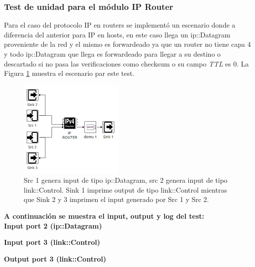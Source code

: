 \documentclass[10pt,a4paper]{article}
\begin{document}
\subsubsection{Test de unidad para el módulo IP Router}

Para el caso del protocolo IP en routers se implementó un escenario donde a diferencia del anterior para IP en hosts, en este caso llega un ip::Datagram proveniente de la red y el mismo es forwardeado ya que un router no tiene capa 4 y todo ip::Datagram que llega es forwardeado para llegar a su destino o descartado si no pasa las verificaciones como checksum o su campo \textit{TTL} es 0. La Figura \ref{figure: unit test ip router} muestra el escenario par este test.\\

\begin{figure}[!b]
    \centering
    \includegraphics[width = 0.45\textwidth]{img/png/unit_tests/ip_router.png}
    \caption{Src 1 genera input de tipo ip::Datagram, src 2 genera input de tipo link::Control. Sink 1 imprime output de tipo link::Control mientras que Sink 2 y 3 imprimen el input generado por Src 1 y Src 2.}
    \label{figure: unit test ip router}
\end{figure}

\newpage

\textbf{A continuación se muestra el input, output y log del test:} \\

\textbf{Input port 2 (ip::Datagram)}


\textbf{Input port 3 (link::Control)}


\textbf{Output port 3 (link::Control)}

\end{document}
